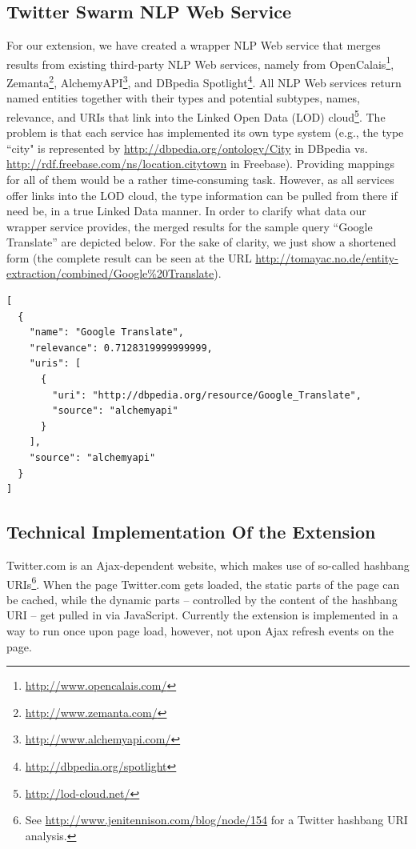 \documentclass[runningheads,a4paper]{llncs}
\begin{document}
\subsection{Twitter Swarm NLP Web Service}\label{sec:webservice}
For our extension, we have created a wrapper NLP Web service that merges results from existing third-party NLP Web services, namely from OpenCalais\footnote{\url{http://www.opencalais.com/}}, Zemanta\footnote{\url{http://www.zemanta.com/}}, AlchemyAPI\footnote{\url{http://www.alchemyapi.com/}}, and DBpedia\cite{Bizer:DBpedia} Spotlight\footnote{\url{http://dbpedia.org/spotlight}}. All NLP Web services return named entities together with their types and potential subtypes, names, relevance, and URIs that link into the Linked Open Data (LOD) cloud\footnote{\url{http://lod-cloud.net/}}. The problem is that each service has implemented its own type system (e.g., the type ``city" is represented by \url{http://dbpedia.org/ontology/City} in DBpedia vs. \url{http://rdf.freebase.com/ns/location.citytown} in Freebase). Providing mappings for all of them would be a rather time-consuming task. However, as all services offer links into the LOD cloud, the type information can be pulled from there if need be, in a true Linked Data manner. In order to clarify what data our wrapper service provides, the merged results for the sample query ``Google Translate'' are depicted below. For the sake of clarity, we just show a shortened form (the complete result can be seen at the URL \url{http://tomayac.no.de/entity-extraction/combined/Google%20Translate}).

\begin{lstlisting}
[
  {
    "name": "Google Translate",
    "relevance": 0.7128319999999999,
    "uris": [
      {
        "uri": "http://dbpedia.org/resource/Google_Translate",
        "source": "alchemyapi"
      }
    ],
    "source": "alchemyapi"
  }
]
\end{lstlisting}

\subsection{Technical Implementation Of the Extension}\label{sec:techimp}
Twitter.com is an Ajax-dependent website, which makes use of so-called hashbang URIs\footnote{See \url{http://www.jenitennison.com/blog/node/154} for a Twitter hashbang URI analysis.}. When the page Twitter.com gets loaded, the static parts of the page can be cached, while the dynamic parts -- controlled by the content of the hashbang URI -- get pulled in via JavaScript. Currently the extension is implemented in a way to run once upon page load, however, not upon Ajax refresh events on the page.
\end{document}
